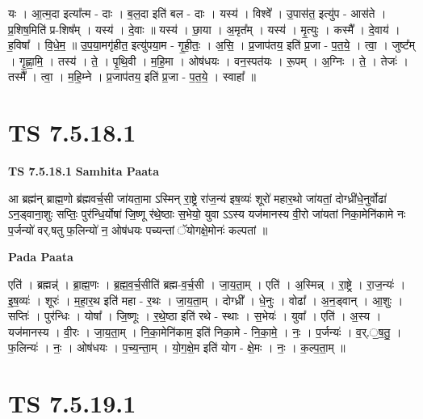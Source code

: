 \documentclass[17pt]{extarticle}
\begin{document}
यः । आ॒त्म॒दा इत्या᳚त्म - दाः । ब॒ल॒दा इति॑ बल - दाः । यस्य॑ । विश्वे᳚ । उ॒पास॑त॒ इत्यु॑प - आस॑ते । प्र॒शिष॒मिति॑ प्र-शिष᳚म् । यस्य॑ । दे॒वाः ॥ यस्य॑ । छा॒या । अ॒मृत᳚म् । यस्य॑ । मृ॒त्युः । कस्मै᳚ । दे॒वाय॑ । ह॒विषा᳚ । वि॒धे॒म॒ ॥ उ॒प॒या॒मगृ॑हीत॒ इत्यु॑पया॒म - गृ॒ही॒तः॒ । अ॒सि॒ । प्र॒जाप॑तय॒ इति॑ प्र॒जा - प॒त॒ये॒ । त्वा॒ । जुष्ट᳚म् । गृ॒ह्णा॒मि॒ । तस्य॑ । ते॒ । पृ॒थि॒वी । म॒हि॒मा । ओष॑धयः । वन॒स्पत॑यः । रू॒पम् । अ॒ग्निः । ते॒ । तेजः॑ । तस्मै᳚ । त्वा॒ । म॒हि॒म्ने । प्र॒जाप॑तय॒ इति॑ प्र॒जा - प॒त॒ये॒ । स्वाहा᳚ ॥  \newline





\section{ TS 7.5.18.1 }

\textbf{TS 7.5.18.1 } \newline
\textbf{Samhita Paata} \newline

आ ब्रह्म॑न् ब्राह्म॒णो ब्र॑ह्मवर्च॒सी जा॑यता॒मा ऽस्मिन् रा॒ष्ट्रे रा॑ज॒न्य॑ इष॒व्यः॑ शूरो॑ महार॒थो जा॑यतां॒ दोग्ध्री॑धे॒नुर्वोढा॑ ऽन॒ड्वाना॒शुः सप्तिः॒ पुर॑न्धि॒र्योषा॑ जि॒ष्णू र॑थे॒ष्ठाः स॒भेयो॒ युवा ऽऽस्य यज॑मानस्य वी॒रो जा॑यतां निका॒मेनि॑कामे नः प॒र्जन्यो॑ वर्.षतु फ॒लिन्यो॑ न॒ ओष॑धयः पच्यन्तां ॅयोगक्षे॒मोनः॑ कल्पतां ॥ \newline

\textbf{Pada Paata} \newline

एति॑ । ब्रह्मन्न्॑ । ब्रा॒ह्म॒णः । ब्र॒ह्म॒व॒र्च॒सीति॑ ब्रह्म-व॒र्च॒सी । जा॒य॒ता॒म् । एति॑ । अ॒स्मिन्न् । रा॒ष्ट्रे । रा॒ज॒न्यः॑ । इ॒ष॒व्यः॑ । शूरः॑ । म॒हा॒र॒थ इति॑ महा - र॒थः । जा॒य॒ता॒म् । दोग्ध्री᳚ । धे॒नुः । वोढा᳚ । अ॒न॒ड्वान् । आ॒शुः । सप्तिः॑ । पुर॑न्धिः । योषा᳚ । जि॒ष्णूः । र॒थे॒ष्ठा इति॑ रथे - स्थाः । स॒भेयः॑ । युवा᳚ । एति॑ । अ॒स्य । यज॑मानस्य । वी॒रः । जा॒य॒ता॒म् । नि॒का॒मेनि॑काम॒ इति॑ निका॒मे - नि॒का॒मे॒ । नः॒ । प॒र्जन्यः॑ । व॒र्.॒ष॒तु॒ । फ॒लिन्यः॑ । नः॒ । ओष॑धयः । प॒च्य॒न्ता॒म् । यो॒ग॒क्षे॒म इति॑ योग - क्षे॒मः । नः॒ । क॒ल्प॒ता॒म् ॥  \newline





\section{ TS 7.5.19.1 }
\end{document}
